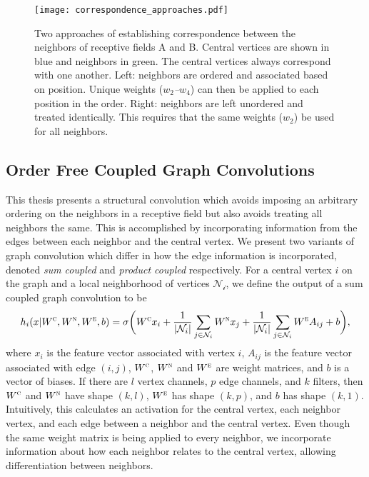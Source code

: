 \begin{figure}
	\centering
	\texttt{[image: correspondence\_approaches.pdf]}
	\caption{Two approaches of establishing correspondence between the neighbors of receptive fields A and B. Central vertices are shown in blue and neighbors in green. The central vertices always correspond with one another. Left: neighbors are ordered and associated based on position. Unique weights (\textit{$w_2$--$w_4$}) can then be applied to each position in the order. Right: neighbors are left unordered and treated identically. This requires that the same weights (\textit{$w_2$}) be used for all neighbors.}
	\label{fig:correspondence_approaches}
\end{figure}


\subsection{Order Free Coupled Graph Convolutions}
This thesis presents a structural convolution which avoids imposing an arbitrary ordering on the neighbors in a receptive field but also avoids treating all neighbors the same.
This is accomplished by incorporating information from the edges between each neighbor and the central vertex.
We present two variants of graph convolution which differ in how the edge information is incorporated, denoted \textit{sum coupled} and \textit{product coupled} respectively.
For a central vertex $i$ on the graph and a local neighborhood of vertices $\mathcal{N_i}$, we define the output of a sum coupled graph convolution to be
\begin{equation}
h_i(x | W^\textsc{c}, W^\textsc{n}, W^\textsc{e}, b) = \sigma \bigg( W^{\textsc{c}} x_i + \frac{1}{|\mathcal{N}_i|}\sum_{j \in \mathcal{N}_i} W^{\textsc{n}} x_j + \frac{1}{|\mathcal{N}_i|}\sum_{j \in \mathcal{N}_i} W^{\textsc{e}} A_{ij} + b \bigg),
\label{eq:sum_coupling}
\end{equation}
where $x_i$ is the feature vector associated with vertex $i$, $A_{ij}$ is the feature vector associated with edge $(i, j)$, $W^\textsc{c}$, $W^\textsc{n}$ and $W^\textsc{e}$ are weight matrices, and $b$ is a vector of biases. 
If there are $l$ vertex channels, $p$ edge channels, and $k$ filters, then $W^\textsc{c}$ and $W^\textsc{n}$ have shape $(k, l)$, $W^\textsc{e}$ has shape $(k, p)$, and $b$ has shape $(k, 1)$.
Intuitively, this calculates an activation for the central vertex, each neighbor vertex, and each edge between a neighbor and the central vertex.
Even though the same weight matrix is being applied to every neighbor, we incorporate information about how each neighbor relates to the central vertex, allowing differentiation between neighbors. 

